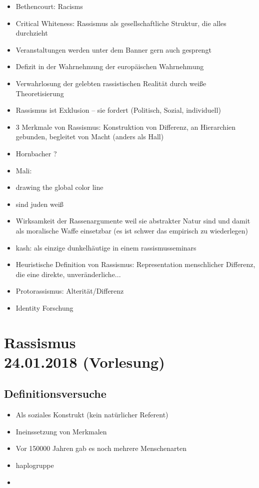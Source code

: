 \documentclass[emulatestandardclasses]{scrartcl}
\begin{document}
\begin{itemize}
  \item Bethencourt: Racisms
  \item Critical Whiteness: Rassismus als gesellschaftliche Struktur, die alles durchzieht
  \item Veranstaltungen werden unter dem Banner gern auch gesprengt
  \item Defizit in der Wahrnehmung der europäischen Wahrnehmung
  \item Verwahrlosung der gelebten rassistischen Realität durch weiße Theoretisierung
  \item Rassismus ist Exklusion -- sie fordert  (Politisch, Sozial, individuell)
  \item 3 Merkmale von Rassismus: Konstruktion von Differenz, an Hierarchien gebunden, begleitet von Macht (anders als Hall)
  \item Hornbacher ?
  \item Mali: 
  \item drawing the global color line
  \item sind juden weiß 
  \item Wirksamkeit der Rassenargumente weil sie abstrakter Natur sind und damit als moralische Waffe einsetzbar (es ist schwer das empirisch zu wiederlegen)
  \item kash: als einzige dunkelhäutige in einem rassismusseminars
  \item Heuristische Definition von Rassismus: Representation menschlicher Differenz, die eine direkte, unveränderliche...
  \item Protorassismus: Alterität/Differenz 
  \item Identity Forschung
\end{itemize}


\section{Rassismus\\24.01.2018 (Vorlesung)}

\subsection{Definitionsversuche}

\begin{itemize}
  \item Als soziales Konstrukt (kein natürlicher Referent)
  \item Ineinssetzung von Merkmalen
  \item Vor 150000 Jahren gab es noch mehrere Menschenarten
  \item haplogruppe
  \item 
\end{itemize}
\end{document}
